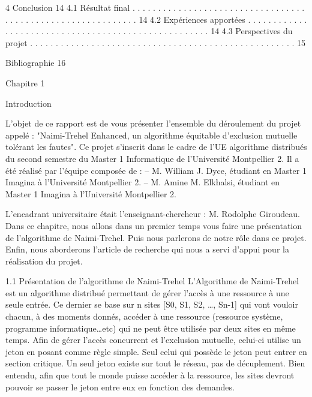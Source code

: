 \documentclass[a4paper,french,towsides,10pt]{book}
\begin{document}
4 Conclusion                                                                                                                                         14
  4.1 Résultat final . . . . . . . . . . . . . . . . . . . . . . . . . . . . . . . . . . . . . . . . . . . . . . . . . . . . . . . . . . . . 14
  4.2 Expériences apportées . . . . . . . . . . . . . . . . . . . . . . . . . . . . . . . . . . . . . . . . . . . . . . . . . . . . 14
  4.3 Perspectives du projet .  . . . . . . . . . . . . . . . . . . . . . . . . . . . . . . . . . . . . . . . . . . . . . . . . . . . 15

Bibliographie                                                                                                                                       16








Chapitre 1

Introduction

L’objet de ce rapport est de vous présenter l’ensemble du déroulement du projet appelé : "Naimi-Trehel Enhanced, un algorithme équitable d’exclusion mutuelle tolérant les fautes". Ce projet s’inscrit dans le cadre de l’UE algorithme distribués du second semestre du Master 1 Informatique de l’Université Montpellier 2.
Il a été réalisé par l’équipe composée de :
– M. William J. Dyce, étudiant en Master 1 Imagina à l’Université Montpellier 2.
– M. Amine M. Elkhalsi, étudiant en Master 1 Imagina à l’Université Montpellier 2.

L’encadrant universitaire était l’enseignant-chercheur : M. Rodolphe Giroudeau.
Dans ce chapitre, nous allons dans un premier temps vous faire une présentation de l’algorithme de Naimi-Trehel. Puis nous parlerons de notre rôle dans ce projet. Enfin, nous aborderons l’article de recherche qui nous a servi d’appui pour la réalisation du projet.

1.1 Présentation de l’algorithme de Naimi-Trehel
	L’Algorithme de Naimi-Trehel est un algorithme distribué permettant de gérer l’accès à une ressource à une seule entrée.
Ce dernier se base sur n sites [S0, S1, S2, …, Sn-1] qui vont vouloir chacun, à des moments donnés, accéder à une ressource (ressource système, programme informatique…etc) qui ne peut être utilisée par deux sites en même temps.
Afin de gérer l’accès concurrent et l’exclusion mutuelle, celui-ci utilise un jeton en posant comme règle simple.
Seul celui qui possède le jeton peut entrer en section critique.
Un seul jeton existe sur tout le réseau, pas de décuplement.
Bien entendu, afin que tout le monde puisse accéder à la ressource, les sites devront pouvoir se passer le jeton entre eux en fonction des demandes.
\end{document}
